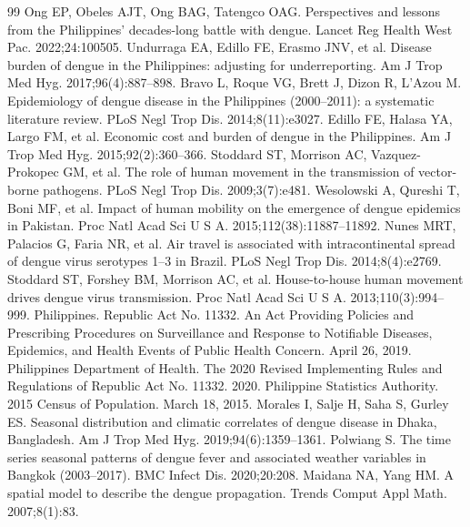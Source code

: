 \documentclass[a4paper,11pt]{article}
\begin{document}
\begin{thebibliography}{99}
 Ong EP, Obeles AJT, Ong BAG, Tatengco OAG. Perspectives and lessons from the Philippines' decades-long battle with dengue. Lancet Reg Health West Pac. 2022;24:100505.
 Undurraga EA, Edillo FE, Erasmo JNV, et al. Disease burden of dengue in the Philippines: adjusting for underreporting. Am J Trop Med Hyg. 2017;96(4):887--898.
 Bravo L, Roque VG, Brett J, Dizon R, L'Azou M. Epidemiology of dengue disease in the Philippines (2000--2011): a systematic literature review. PLoS Negl Trop Dis. 2014;8(11):e3027.
 Edillo FE, Halasa YA, Largo FM, et al. Economic cost and burden of dengue in the Philippines. Am J Trop Med Hyg. 2015;92(2):360--366.
 Stoddard ST, Morrison AC, Vazquez-Prokopec GM, et al. The role of human movement in the transmission of vector-borne pathogens. PLoS Negl Trop Dis. 2009;3(7):e481.
 Wesolowski A, Qureshi T, Boni MF, et al. Impact of human mobility on the emergence of dengue epidemics in Pakistan. Proc Natl Acad Sci U S A. 2015;112(38):11887--11892.
 Nunes MRT, Palacios G, Faria NR, et al. Air travel is associated with intracontinental spread of dengue virus serotypes 1--3 in Brazil. PLoS Negl Trop Dis. 2014;8(4):e2769.
 Stoddard ST, Forshey BM, Morrison AC, et al. House-to-house human movement drives dengue virus transmission. Proc Natl Acad Sci U S A. 2013;110(3):994--999.
 Philippines. Republic Act No. 11332. An Act Providing Policies and Prescribing Procedures on Surveillance and Response to Notifiable Diseases, Epidemics, and Health Events of Public Health Concern. April 26, 2019.
 Philippines Department of Health. The 2020 Revised Implementing Rules and Regulations of Republic Act No. 11332. 2020.
 Philippine Statistics Authority. 2015 Census of Population. March 18, 2015.
 Morales I, Salje H, Saha S, Gurley ES. Seasonal distribution and climatic correlates of dengue disease in Dhaka, Bangladesh. Am J Trop Med Hyg. 2019;94(6):1359--1361.
 Polwiang S. The time series seasonal patterns of dengue fever and associated weather variables in Bangkok (2003--2017). BMC Infect Dis. 2020;20:208.
 Maidana NA, Yang HM. A spatial model to describe the dengue propagation. Trends Comput Appl Math. 2007;8(1):83.

\end{thebibliography}
\end{document}
